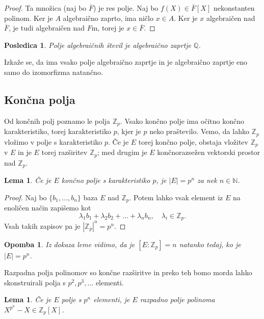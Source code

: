 \documentclass[10pt, a4paper]{article}
\newtheorem{posledica}[izr]{Posledica}
\newtheorem*{opomba}{Opomba}
\newtheorem{lema}[izr]{Lema}
\newenvironment{noticeC}{%
  \tcolorbox[%
  notitle,
  empty,
  enhanced,  %
  breakable,
  coltext=black, 
  fontupper=\rmfamily,
  noparskip,
  sharp corners,
  boxrule=-1pt,  %
  frame hidden,
  left=7pt,  %
  right=7pt,
  top=5pt,
  bottom=5pt,
  before skip=2.5ex plus 2pt,
  after skip=2.5ex plus 2pt,
  overlay unbroken and last={%
  },
  ]}
{\endtcolorbox}
\newenvironment{dokaz}%
  {\begin{noticeC}\begin{proof}}%
  {\end{proof}\end{noticeC}}
\newcommand{\N}{\mathbb {N}}
\newcommand{\Z}{\mathbb {Z}}
\newcommand{\Q}{\mathbb {Q}}
\begin{document}
\begin{dokaz}
  Ta množica (naj bo $\overline{F}$) je res polje. Naj bo $f(X) \in \overline{F}[X]$ 
  nekonstanten polinom. Ker je $A$ algebraično zaprto, ima ničlo $x \in A$.
  Ker je $x$ algebraičen nad $\overline{F}$, je tudi algebraičen nad $F$m, torej je $x \in \overline{F}$.
\end{dokaz}

\begin{posledica}
  Polje algebraičnih števil je algebraično zaprtje $\Q$.
\end{posledica}

Izkaže se, da ima vsako polje algebraično zaprtje in je algebraično zaprtje eno samo do izomorfizma natančno.

\subsection{Končna polja}

Od končnih polj poznamo le polja $\Z_p$. Vsako končno polje ima očitno končno karakteristiko,
torej karakteristiko $p$, kjer je $p$ neko praštevilo. Vemo, da lahko $\Z_p$ vložimo v polje s karakteristiko $p$.
Če je $E$ torej končno polje, obstaja vložitev $\Z_p$ v $E$ in je $E$ torej razširitev $\Z_p$;
med drugim je $E$ končnorazsežen vektorski prostor nad $\Z_p$. 

\begin{lema}
  Če je $E$ končno polje s karakteristiko $p$, je $|E| = p^n$ za nek $n \in \N$.
\end{lema}

\begin{dokaz}
  Naj bo $\{b_1, \dots, b_n\}$ baza $E$ nad $\Z_p$.
  Potem lahko vsak element iz $E$ na enoličen način zapišemo kot 
  $$\lambda_1 b_1 + \lambda_2 b_2 + \dots + \lambda_n b_n,\quad \lambda_i \in \Z_p.$$
  Vsah takih zapisov pa je $|\Z_p|^n = p^n.$
\end{dokaz}

\begin{opomba}
  Iz dokaza leme vidimo, da je $[E : \Z_p] = n$ natanko tedaj, ko je $|E| = p^n$.
\end{opomba}

Razpadna polja polinomov so končne razširitve in preko teh bomo morda lahko skonstruirali 
polja s $p^2, p^3, \dots$ elementi.

\begin{lema}
  Če je $E$ polje s $p^n$ elementi, je $E$ razpadno polje polinoma $X^{p^n} - X \in \Z_p [X]$.
\end{lema}
\end{document}
